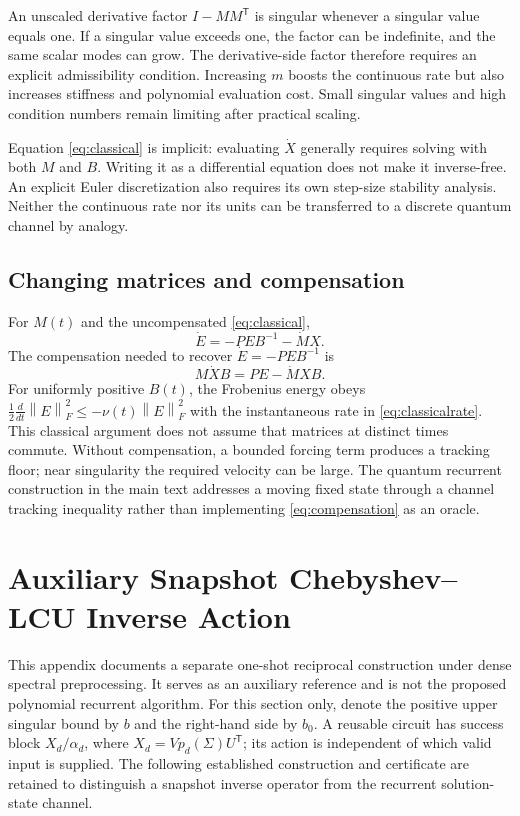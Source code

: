 \documentclass[10pt]{article}
\newcommand{\norm}[1]{\left\lVert #1\right\rVert}
\newcommand{\tr}{\mathsf T}
\begin{document}
An unscaled derivative factor $I-MM^{\tr}$ is singular whenever a singular value equals one. If a singular value exceeds one, the factor can be indefinite, and the same scalar modes can grow. The derivative-side factor therefore requires an explicit admissibility condition. Increasing $m$ boosts the continuous rate but also increases stiffness and polynomial evaluation cost. Small singular values and high condition numbers remain limiting after practical scaling.

Equation \eqref{eq:classical} is implicit: evaluating $\dot X$ generally requires solving with both $M$ and $B$. Writing it as a differential equation does not make it inverse-free. An explicit Euler discretization also requires its own step-size stability analysis. Neither the continuous rate nor its units can be transferred to a discrete quantum channel by analogy.

\subsection{Changing matrices and compensation}
For $M(t)$ and the uncompensated \eqref{eq:classical},
\begin{equation}\label{eq:forcing}
\dot E=-PEB^{-1}-\dot M X.
\end{equation}
The compensation needed to recover $\dot E=-PEB^{-1}$ is
\begin{equation}\label{eq:compensation}
M\dot X B=PE-\dot M X B.
\end{equation}
For uniformly positive $B(t)$, the Frobenius energy obeys $\tfrac12\frac{d}{dt}\norm E_F^2\le-\nu(t)\norm E_F^2$ with the instantaneous rate in \eqref{eq:classicalrate}. This classical argument does not assume that matrices at distinct times commute. Without compensation, a bounded forcing term produces a tracking floor; near singularity the required velocity can be large. The quantum recurrent construction in the main text addresses a moving fixed state through a channel tracking inequality rather than implementing \eqref{eq:compensation} as an oracle.


\section{Auxiliary Snapshot Chebyshev--LCU Inverse Action}\label{sec:snapshot}
This appendix documents a separate one-shot reciprocal construction under dense spectral preprocessing. It serves as an auxiliary reference and is not the proposed polynomial recurrent algorithm.
For this section only, denote the positive upper singular bound by $b$ and the right-hand side by $b_0$. A reusable circuit has success block $X_d/\alpha_d$, where $X_d=Vp_d(\Sigma)U^{\tr}$; its action is independent of which valid input is supplied. The following established construction and certificate are retained to distinguish a snapshot inverse operator from the recurrent solution-state channel.
\end{document}
